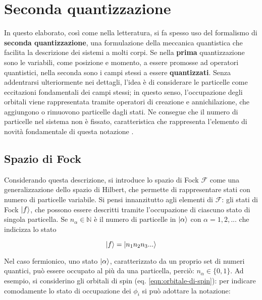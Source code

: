 \section{Seconda quantizzazione}\label{sez:seconda-quantizzazione}

In questo elaborato, così come nella letteratura, si fa spesso uso del formalismo di \textbf{seconda quantizzazione}, una formulazione della meccanica quantistica che facilita la descrizione dei sistemi a molti corpi. Se nella \textbf{prima} quantizzazione sono le variabili, come posizione e momento, a essere promosse ad operatori quantistici, nella seconda sono i campi stessi a essere \textbf{quantizzati}. Senza addentrarsi ulteriormente nei dettagli, l’idea è di considerare le particelle come eccitazioni fondamentali dei campi stessi; in questo senso, l’occupazione degli orbitali viene rappresentata tramite operatori di creazione e annichilazione, che aggiungono o rimuovono particelle dagli stati. Ne consegue che il numero di particelle nel sistema non è fissato, caratteristica che rappresenta l'elemento di novità fondamentale di questa notazione \cite{second_q}.

\subsection{Spazio di Fock}

Considerando questa descrizione, si introduce lo spazio di Fock $\mathcal{F}$ come una generalizzazione dello spazio di Hilbert, che permette di rappresentare stati con numero di particelle variabile. Si pensi innanzitutto agli elementi di $\mathcal{F}$: gli stati di Fock $\ket{f}$, che possono essere descritti tramite l'occupazione di ciascuno stato di singola particella. Se $n_\alpha\in\mathbb{N}$ è il numero di particelle in $\ket{\alpha}$ con $\alpha=1,2,...$ che indicizza lo stato

\begin{equation}\label{eqn:stato-di-Fock}
    \ket{f} = \ket{n_1 n_2 n_3 ...}
\end{equation}

Nel caso fermionico, uno stato $\ket{\alpha}$, caratterizzato da un proprio set di numeri quantici, può essere occupato al più da una particella, perciò: $n_\alpha\in\{0,1\}$. 
Ad esempio, si considerino gli orbitali di spin (eq. \ref{eqn:orbitale-di-spin}): per indicare comodamente lo stato di occupazione dei $\phi_i$ si può adottare la notazione:

